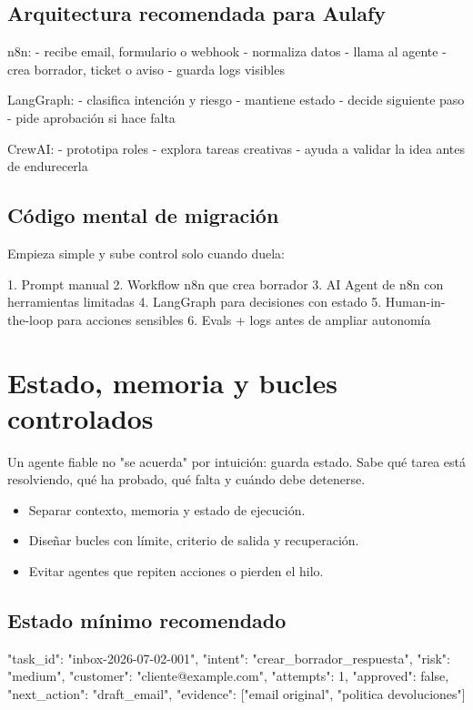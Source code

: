 \documentclass[11pt,a4paper]{book}
\begin{document}
\section{Arquitectura recomendada para Aulafy}
\begin{codebox}
n8n:
  - recibe email, formulario o webhook
  - normaliza datos
  - llama al agente
  - crea borrador, ticket o aviso
  - guarda logs visibles

LangGraph:
  - clasifica intención y riesgo
  - mantiene estado
  - decide siguiente paso
  - pide aprobación si hace falta

CrewAI:
  - prototipa roles
  - explora tareas creativas
  - ayuda a validar la idea antes de endurecerla
\end{codebox}
\section{Código mental de migración}
Empieza simple y sube control solo cuando duela:

\begin{codebox}
1. Prompt manual
2. Workflow n8n que crea borrador
3. AI Agent de n8n con herramientas limitadas
4. LangGraph para decisiones con estado
5. Human-in-the-loop para acciones sensibles
6. Evals + logs antes de ampliar autonomía
\end{codebox}
\chapter{Estado, memoria y bucles controlados}
Un agente fiable no "se acuerda" por intuición: guarda estado. Sabe qué tarea está resolviendo, qué ha probado, qué falta y cuándo debe detenerse.

\begin{itemize}\item Separar contexto, memoria y estado de ejecución.\end{itemize}
\begin{itemize}\item Diseñar bucles con límite, criterio de salida y recuperación.\end{itemize}
\begin{itemize}\item Evitar agentes que repiten acciones o pierden el hilo.\end{itemize}
\section{Estado mínimo recomendado}
\begin{codebox}
{
  "task_id": "inbox-2026-07-02-001",
  "intent": "crear_borrador_respuesta",
  "risk": "medium",
  "customer": "cliente@example.com",
  "attempts": 1,
  "approved": false,
  "next_action": "draft_email",
  "evidence": ["email original", "politica devoluciones"]
}
\end{codebox}
\end{document}
